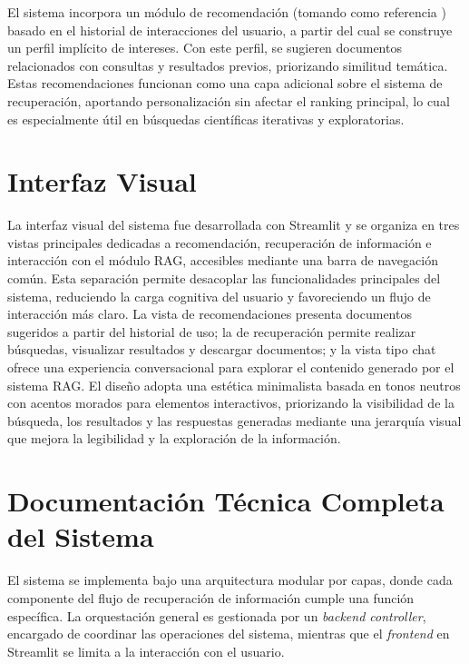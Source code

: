 \documentclass[runningheads]{llncs}
\begin{document}
El sistema incorpora un módulo de recomendación (tomando como referencia \cite{recsys}) basado en el historial de interacciones del usuario, 
a partir del cual se construye un perfil implícito de intereses. 
Con este perfil, se sugieren documentos relacionados con consultas y resultados previos, priorizando similitud temática. 
Estas recomendaciones funcionan como una capa adicional sobre el sistema de recuperación, aportando personalización sin afectar el ranking principal, 
lo cual es especialmente útil en búsquedas científicas iterativas y exploratorias.

\section{Interfaz Visual}

La interfaz visual del sistema fue desarrollada con Streamlit y se organiza en tres vistas principales dedicadas a recomendación, 
recuperación de información e interacción con el módulo RAG, accesibles mediante una barra de navegación común. 
Esta separación permite desacoplar las funcionalidades principales del sistema, reduciendo la carga cognitiva del usuario y 
favoreciendo un flujo de interacción más claro. 
La vista de recomendaciones presenta documentos sugeridos a partir del historial de uso; 
la de recuperación permite realizar búsquedas, visualizar resultados y descargar documentos; 
y la vista tipo chat ofrece una experiencia conversacional para explorar el contenido generado por el sistema RAG. 
El diseño adopta una estética minimalista basada en tonos neutros con acentos morados para elementos interactivos, 
priorizando la visibilidad de la búsqueda, los resultados y las respuestas generadas mediante una jerarquía visual que mejora la legibilidad 
y la exploración de la información.

\section{Documentación Técnica Completa del Sistema}

El sistema se implementa bajo una arquitectura modular por capas, donde cada componente del flujo de recuperación de información cumple una función específica. 
La orquestación general es gestionada por un \textit{backend controller}, encargado de coordinar las operaciones del sistema, 
mientras que el \textit{frontend} en Streamlit se limita a la interacción con el usuario.
\end{document}
